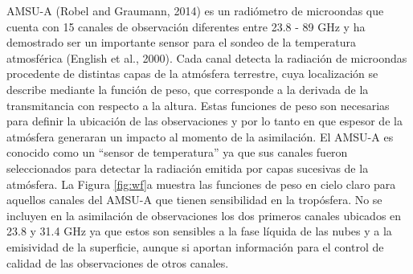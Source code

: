 \documentclass[12pt,oneside,a4paper]{reedthesis}
\begin{document}
AMSU-A (Robel and Graumann, 2014) es un radiómetro de microondas que cuenta con 15 canales de observación diferentes entre 23.8 - 89 GHz y ha demostrado ser un importante sensor para el sondeo de la temperatura atmosférica (English et al., 2000). Cada canal detecta la radiación de microondas procedente de distintas capas de la atmósfera terrestre, cuya localización se describe mediante la función de peso, que corresponde a la derivada de la transmitancia con respecto a la altura. Estas funciones de peso son necesarias para definir la ubicación de las observaciones y por lo tanto en que espesor de la atmósfera generaran un impacto al momento de la asimilación. El AMSU-A es conocido como un ``sensor de temperatura'' ya que sus canales fueron seleccionados para detectar la radiación emitida por capas sucesivas de la atmósfera. La Figura \ref{fig:wf}a muestra las funciones de peso en cielo claro para aquellos canales del AMSU-A que tienen sensibilidad en la tropósfera. No se incluyen en la asimilación de observaciones los dos primeros canales ubicados en 23.8 y 31.4 GHz ya que estos son sensibles a la fase líquida de las nubes y a la emisividad de la superficie, aunque si aportan información para el control de calidad de las observaciones de otros canales.
\end{document}
